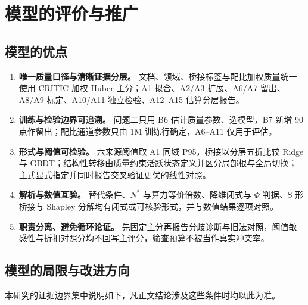 \section{模型的评价与推广}
\label{sec:7}

\subsection{模型的优点}
\label{sec:7.1}

\begin{enumerate}
\item \textbf{唯一质量口径与清晰证据分层。} 文档、领域、桥接标签与配比加权质量统一使用 CRITIC 加权 Huber 主分；A1 拟合、A2/A3 扩展、A6/A7 留出、A8/A9 标定、A10/A11 独立检验、A12–A15 估算分层报告。
\item \textbf{训练与检验边界可追溯。} 问题二只用 B6 估计质量参数、选模型，B7 新增 90 点作留出；配比通道参数只由 1M 训练行确定，A6–A11 仅用于评估。
\item \textbf{形式与阈值可检验。} 六来源阈值取 A1 同域 P95，桥接以分层五折比较 Ridge 与 GBDT；结构性转移由质量约束活跃状态定义并区分局部根与全局切换；主式显式指定并同时报告交叉验证更优的线性对照。
\item \textbf{解析与数值互验。} 替代条件、$N^*$ 与算力等价倍数、降维闭式与 $\Phi$ 判据、S 形桥接与 Shapley 分解均有闭式或可核验形式，并与数值结果逐项对照。
\item \textbf{职责分离、避免循环论证。} 先固定主分再报告分歧诊断与旧法对照，阈值敏感性与折扣对照分均不回写主评分，筛查预算不被当作真实冲突率。
\end{enumerate}

\subsection{模型的局限与改进方向}
\label{sec:7.2}

本研究的证据边界集中说明如下，凡正文结论涉及这些条件时均以此为准。

